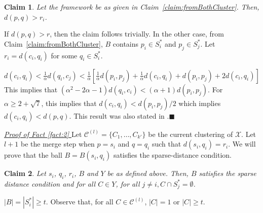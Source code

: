 \documentclass[orivec]{llncs}
\newtheorem{smallLemma}{Claim}
\newcommand{\mc}{\mathcal}
\renewcommand{\qed}{\hfill\ensuremath{\blacksquare}}
\begin{document}
\begin{smallLemma}
\label{claim:maxrirj}
Let the framework be as given in Claim~\ref{claim:fromBothCluster}. Then, $d(p, q) > r_i$.
\end{smallLemma}

\vspace{-0.1in} \noindent If $d(p, q) > r$, then the claim follows trivially. In the other case, from Claim~\ref{claim:fromBothCluster}, $B$ contains $p_i \in S_i^*$ and $p_j \in S_j^*$. Let $r_i = d(c_i, q_i)$ for some $q_i \in S_i^*$.

$d(c_i, q_i) < \frac{1}{\alpha} d(q_i, c_j) < \frac{1}{\alpha} [ \frac{1}{\alpha}d(p_i, p_j) + \frac{1}{\alpha}d(c_i, q_i) + d(p_i, p_j) + 2d(c_i, q_i)]$
This implies that $(\alpha^2 - 2\alpha - 1)d(q_i, c_i) < (\alpha + 1) d(p_i, p_j)$. For $\alpha \ge 2 + \sqrt 7$, this implies that $d(c_i, q_i) < d(p_i, p_j)/2$ which implies $d(c_i, q_i) < d(p, q)$. This result was also stated in \cite{balcan2012clustering}.\qed

\noindent\textit{\underline{Proof of Fact \ref{fact:2}
}}
Let $\mc C^{(l)} = \{C_1, \ldots, C_{k'}\}$ be the current clustering of $\mc X$. Let $l+1$ be the merge step when $p = s_i$ and $q = q_i$ such that $d(s_i, q_i) = r_i$. We will prove that the ball $B = B(s_i, q_i)$ satisfies the sparse-distance condition.

\begin{smallLemma}
\label{claim:dciqi}
Let $s_i$, $q_i$, $r_i$, $B$ and $Y$ be as defined above. Then, $B$ satisfies the sparse distance condition and for all $C \in Y$, for all $j \neq i, C \cap S_j^* = \emptyset$.
\end{smallLemma}
\vspace{-0.1in} $|B| = |S_i^*| \ge t$. Observe that, for all $C \in \mc C^{(l)}$, $|C| = 1$ or $|C| \ge t$. 
\end{document}
